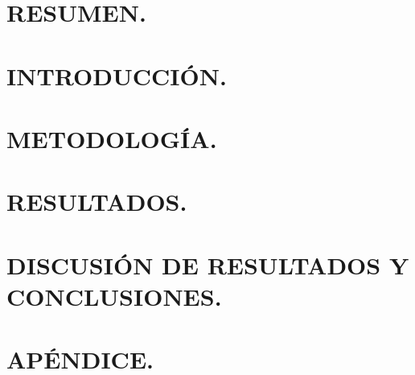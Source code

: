 \documentclass[10pt,a4paper]{article}
\begin{document}
\portada

\section{RESUMEN.} %

\section{INTRODUCCIÓN.} %


\section{METODOLOGÍA.} %

\section{RESULTADOS.} %

\section{DISCUSIÓN DE RESULTADOS Y CONCLUSIONES.} %

% 
% 

\section{APÉNDICE.} %
\end{document}
